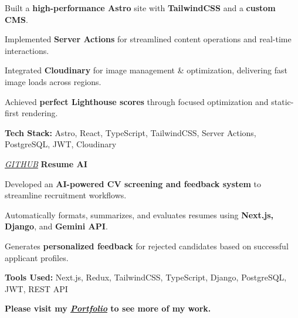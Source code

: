     \vspace{0.10 cm}
    \begin{onecolentry}
        \begin{highlights}
            \item Built a \textbf{high-performance Astro} site with \textbf{TailwindCSS} and a \textbf{custom CMS}.
            \item Implemented \textbf{Server Actions} for streamlined content operations and real-time interactions.
            \item Integrated \textbf{Cloudinary} for image management \& optimization, delivering fast image loads across regions.
            \item Achieved \textbf{perfect Lighthouse scores} through focused optimization and static-first rendering.
            \vspace{0.1 cm}
            \item \textbf{Tech Stack:} Astro, React, TypeScript, TailwindCSS, Server Actions, PostgreSQL, JWT, Cloudinary
        \end{highlights}
    \end{onecolentry}
    \vspace{0.2 cm}

    \begin{twocolentry}{
    \textit{\href{https://github.com/ehsan18t/resume-ai}{GITHUB}}}
        \textbf{Resume AI}
    \end{twocolentry}

    \begin{onecolentry}
        \begin{highlights}
            \item Developed an \textbf{AI-powered CV screening and feedback system} to streamline recruitment workflows.
            \item Automatically formats, summarizes, and evaluates resumes using \textbf{Next.js, Django}, and \textbf{Gemini API}.
            \item Generates \textbf{personalized feedback} for rejected candidates based on successful applicant profiles.
            \vspace{0.1 cm}
            \item \textbf{Tools Used:} Next.js, Redux, TailwindCSS, TypeScript, Django, PostgreSQL, JWT, REST API
        \end{highlights}
    \end{onecolentry}


    \vspace{0.3 cm}
    \textbf{Please visit my \textit{\href{https://ehsankhan.me}{Portfolio}} to see more of my work.}
